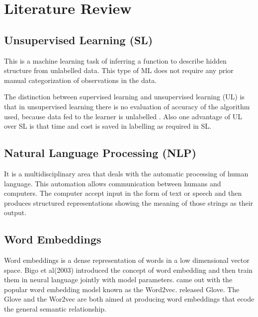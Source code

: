 \chapter{Literature Review}
\section{Unsupervised Learning (SL)}
This is a machine learning task of inferring a function to describe hidden structure from unlabelled data. This type of ML does not require any prior manual categorization of observations in the data. 

The distinction between supervised learning and unsupervised learning (UL) is that in unsupervised learning there is no evaluation of accuracy of the algorithm used, because data fed to the learner is unlabelled . Also one advantage of UL over SL is that time and cost is saved in labelling as required in SL. 
\section{Natural Language Processing (NLP)}
It is a multidisciplinary area that deals with the automatic processing of human language. 
This automation allows communication between humans and computers. The computer accept input in the form of text or speech and then produces structured representations showing the meaning of those strings as their output.



\section{Word Embeddings}
Word embeddings is a dense representation of words in a low dimensional vector space. Bigo et al(2003) introduced the  concept of word embedding and then train them in neural language jointly with model parameters. \citep{mikolov2013distributed} came out with the popular word embedding model known as the Word2vec. 
\cite{faruqui2014retrofitting} released Glove. The Glove and the Wor2vec are both aimed at producing word embeddings that ecode the general semantic relationship.
